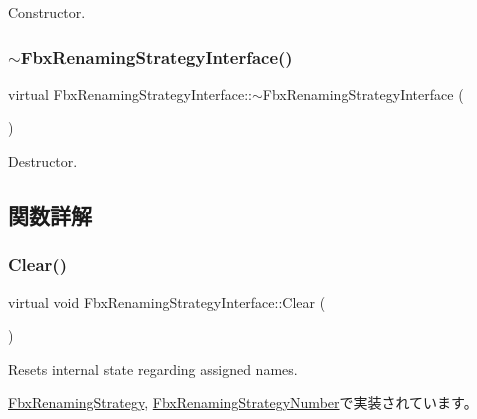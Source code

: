 Constructor. 

\mbox{\label{class_fbx_renaming_strategy_interface_ab52664f630e238593eeba2bb204cebbe}} 
\subsubsection{\texorpdfstring{$\sim$\+Fbx\+Renaming\+Strategy\+Interface()}{~FbxRenamingStrategyInterface()}}
{\footnotesize\ttfamily virtual Fbx\+Renaming\+Strategy\+Interface\+::$\sim$\+Fbx\+Renaming\+Strategy\+Interface (\begin{DoxyParamCaption}{ }\end{DoxyParamCaption})\hspace{0.3cm}{\ttfamily [virtual]}}



Destructor. 



\subsection{関数詳解}
\mbox{\label{class_fbx_renaming_strategy_interface_a2090b5ae43936b617ec5d75015923f69}} 
\subsubsection{\texorpdfstring{Clear()}{Clear()}}
{\footnotesize\ttfamily virtual void Fbx\+Renaming\+Strategy\+Interface\+::\+Clear (\begin{DoxyParamCaption}{ }\end{DoxyParamCaption})\hspace{0.3cm}{\ttfamily [pure virtual]}}



Resets internal state regarding assigned names. 



\hyperlink{class_fbx_renaming_strategy_a87b1e89413d7b8c86a9d8a9f6fa6490f}{Fbx\+Renaming\+Strategy}, \hyperlink{class_fbx_renaming_strategy_number_aaf762d4d2ab243e6868b5d77a3ed8040}{Fbx\+Renaming\+Strategy\+Number}で実装されています。

